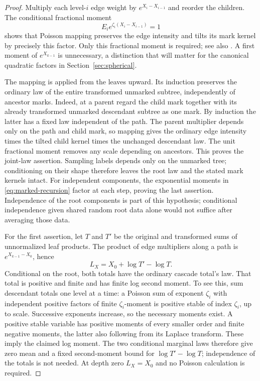 \documentclass[11pt]{article}
\begin{document}
\begin{proof}
Multiply each level-$i$ edge weight by $e^{X_i-X_{i-1}}$ and reorder the
children. The conditional fractional moment
\[
 E_i e^{\zeta_i(X_i-X_{i-1})}=1
\]
shows that Poisson mapping preserves the edge intensity and tilts its mark
kernel by precisely this factor. Only this fractional moment is required;
see also \cite[Appendix, Proposition~A.2]{BolthausenSznitman1998}.
A first moment of $e^{X_{k-1}}$ is unnecessary, a distinction that will
matter for the canonical quadratic factors in Section~\ref{sec:spherical}.

The mapping is applied from the leaves upward. Its induction preserves the
ordinary law of the entire transformed unmarked subtree, independently of
ancestor marks. Indeed, at a parent regard the child mark together with its
already transformed unmarked descendant subtree as one mark. By induction
the latter has a fixed law independent of the path. The parent multiplier
depends only on the path and child mark, so mapping gives the ordinary edge
intensity times the tilted child kernel times the unchanged descendant
law. The unit fractional moment removes any scale depending on ancestors.
This proves the joint-law assertion. Sampling labels depends only on the
unmarked tree; conditioning on their shape therefore leaves the root law
and the stated mark kernels intact. For independent components, the
exponential moments in \eqref{eq:marked-recursion} factor at each step,
proving the last assertion. Independence of the root components is part
of this hypothesis; conditional independence given shared random root
data alone would not suffice after averaging those data.

For the first assertion, let $T$ and $T'$ be the original and transformed
sums of unnormalized leaf products. The product of edge multipliers along
a path is $e^{X_{k-1}-X_0}$, hence
\[
 L_X=X_0+\log T'-\log T.
\]
Conditional on the root, both totals have the ordinary cascade total's
law. That total is positive and finite and has finite log second moment.
To see this, sum descendant totals one level at a time: a Poisson sum
of exponent $\zeta_i$ with independent positive factors of finite
$\zeta_i$-moment is positive stable of index $\zeta_i$, up to scale.
Successive exponents increase, so the necessary moments exist. A positive
stable variable has positive moments of every smaller order and finite
negative moments, the latter also following from its Laplace transform.
These imply the claimed log moment. The two conditional marginal laws
therefore give zero mean and a fixed second-moment bound for
$\log T'-\log T$; independence of the totals is not needed.
At depth zero $L_X=X_0$ and no Poisson calculation is required.
\end{proof}
\end{document}
